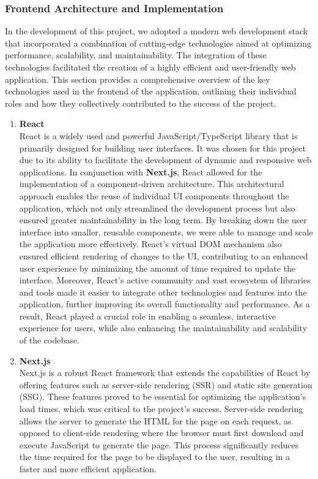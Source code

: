 \subsubsection{Frontend Architecture and Implementation}
In the development of this project, we adopted a modern web development stack that incorporated a combination of cutting-edge technologies aimed at optimizing performance, scalability, and maintainability. The integration of these technologies facilitated the creation of a highly efficient and user-friendly web application. This section provides a comprehensive overview of the key technologies used in the frontend of the application, outlining their individual roles and how they collectively contributed to the success of the project.
\begin{enumerate}
    \item \textbf{React} \\
     React is a widely used and powerful JavaScript/TypeScript library that is primarily designed for building user interfaces. It was chosen for this project due to its ability to facilitate the development of dynamic and responsive web applications. In conjunction with \textbf{Next.js}, React allowed for the implementation of a component-driven architecture. This architectural approach enables the reuse of individual UI components throughout the application, which not only streamlined the development process but also ensured greater maintainability in the long term. By breaking down the user interface into smaller, reusable components, we were able to manage and scale the application more effectively. React’s virtual DOM mechanism also ensured efficient rendering of changes to the UI, contributing to an enhanced user experience by minimizing the amount of time required to update the interface.
    \newline
    Moreover, React’s active community and vast ecosystem of libraries and tools made it easier to integrate other technologies and features into the application, further improving its overall functionality and performance. As a result, React played a crucial role in enabling a seamless, interactive experience for users, while also enhancing the maintainability and scalability of the codebase.

    \item \textbf{Next.js} \\
    Next.js is a robust React framework that extends the capabilities of React by offering features such as server-side rendering (SSR) and static site generation (SSG). These features proved to be essential for optimizing the application's load times, which was critical to the project’s success. Server-side rendering allows the server to generate the HTML for the page on each request, as opposed to client-side rendering where the browser must first download and execute JavaScript to generate the page. This process significantly reduces the time required for the page to be displayed to the user, resulting in a faster and more efficient application.


\end{enumerate}
